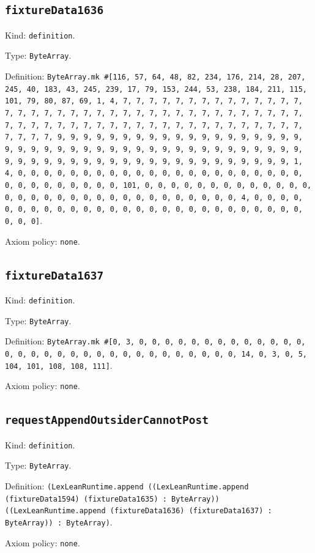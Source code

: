 \documentclass[11pt]{article}
\begin{document}
\subsection*{\texttt{fixtureData1636}}
\noindent Kind: \texttt{definition}.\par
\noindent Type: \texttt{ByteArray}.\par
\noindent Definition: \texttt{ByteArray.mk \#[116, 57, 64, 48, 82, 234, 176, 214, 28, 207, 245, 40, 183, 43, 245, 239, 17, 79, 153, 244, 53, 238, 184, 211, 115, 101, 79, 80, 87, 69, 1, 4, 7, 7, 7, 7, 7, 7, 7, 7, 7, 7, 7, 7, 7, 7, 7, 7, 7, 7, 7, 7, 7, 7, 7, 7, 7, 7, 7, 7, 7, 7, 7, 7, 7, 7, 7, 7, 7, 7, 7, 7, 7, 7, 7, 7, 7, 7, 7, 7, 7, 7, 7, 7, 7, 7, 7, 7, 7, 7, 7, 7, 7, 7, 7, 7, 9, 9, 9, 9, 9, 9, 9, 9, 9, 9, 9, 9, 9, 9, 9, 9, 9, 9, 9, 9, 9, 9, 9, 9, 9, 9, 9, 9, 9, 9, 9, 9, 9, 9, 9, 9, 9, 9, 9, 9, 9, 9, 9, 9, 9, 9, 9, 9, 9, 9, 9, 9, 9, 9, 9, 9, 9, 9, 9, 9, 9, 9, 9, 9, 1, 4, 0, 0, 0, 0, 0, 0, 0, 0, 0, 0, 0, 0, 0, 0, 0, 0, 0, 0, 0, 0, 0, 0, 0, 0, 0, 0, 0, 0, 0, 0, 0, 101, 0, 0, 0, 0, 0, 0, 0, 0, 0, 0, 0, 0, 0, 0, 0, 0, 0, 0, 0, 0, 0, 0, 0, 0, 0, 0, 0, 0, 0, 0, 0, 4, 0, 0, 0, 0, 0, 0, 0, 0, 0, 0, 0, 0, 0, 0, 0, 0, 0, 0, 0, 0, 0, 0, 0, 0, 0, 0, 0, 0, 0, 0]}.\par
\noindent Axiom policy: \texttt{none}.\par
\subsection*{\texttt{fixtureData1637}}
\noindent Kind: \texttt{definition}.\par
\noindent Type: \texttt{ByteArray}.\par
\noindent Definition: \texttt{ByteArray.mk \#[0, 3, 0, 0, 0, 0, 0, 0, 0, 0, 0, 0, 0, 0, 0, 0, 0, 0, 0, 0, 0, 0, 0, 0, 0, 0, 0, 0, 0, 0, 0, 0, 0, 14, 0, 3, 0, 5, 104, 101, 108, 108, 111]}.\par
\noindent Axiom policy: \texttt{none}.\par
\subsection*{\texttt{requestAppendOutsiderCannotPost}}
\noindent Kind: \texttt{definition}.\par
\noindent Type: \texttt{ByteArray}.\par
\noindent Definition: \texttt{(LexLeanRuntime.append ((LexLeanRuntime.append (fixtureData1594) (fixtureData1635) : ByteArray)) ((LexLeanRuntime.append (fixtureData1636) (fixtureData1637) : ByteArray)) : ByteArray)}.\par
\noindent Axiom policy: \texttt{none}.\par
\end{document}
